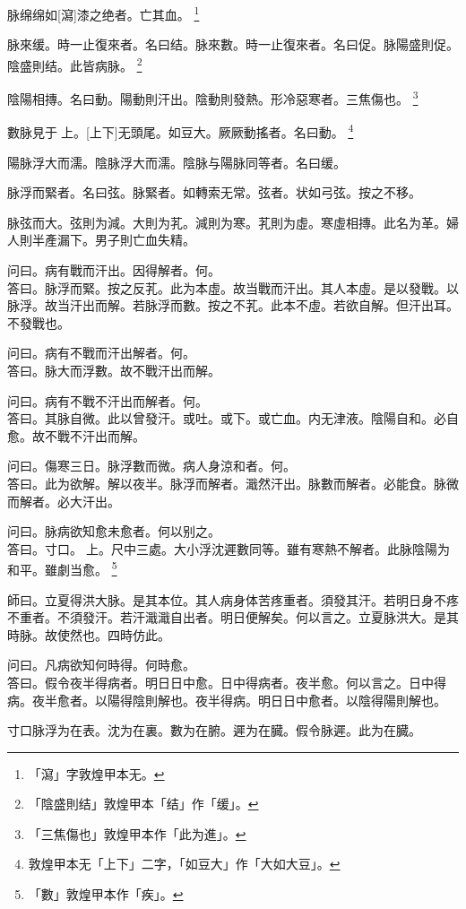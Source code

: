 \documentclass[oneside,b4paper]{ctexbook}
\begin{document}
\begin{flushleft}
脉绵绵如[瀉]漆之绝者。亡其血。
\footnote{「瀉」字敦煌甲本无。}

脉來缓。時一止復來者。名曰结。脉來數。時一止復來者。名曰促。脉陽盛則促。陰盛則结。此皆病脉。
\footnote{「陰盛則结」敦煌甲本「结」作「缓」。}

陰陽相摶。名曰動。陽動則汗出。陰動則發熱。形冷惡寒者。三焦傷也。
\footnote{「三焦傷也」敦煌甲本作「此为進」。}

數脉見于{𬮦}上。[上下]无頭尾。如豆大。厥厥動搖者。名曰動。
\footnote{敦煌甲本无「上下」二字，「如豆大」作「大如大豆」。}

陽脉浮大而濡。陰脉浮大而濡。陰脉与陽脉同等者。名曰缓。

脉浮而緊者。名曰弦。脉緊者。如轉索无常。弦者。状如弓弦。按之不移。

脉弦而大。弦則为減。大則为芤。減則为寒。芤則为虛。寒虛相摶。此名为革。婦人則半產漏下。男子則亡血失精。

问曰。病有戰而汗出。因得解者。何。\\
答曰。脉浮而緊。按之反芤。此为本虛。故当戰而汗出。其人本虛。是以發戰。以脉浮。故当汗出而解。若脉浮而數。按之不芤。此本不虛。若欲自解。但汗出耳。不發戰也。

问曰。病有不戰而汗出解者。何。\\
答曰。脉大而浮數。故不戰汗出而解。

问曰。病有不戰不汗出而解者。何。\\
答曰。其脉自微。此以曾發汗。或吐。或下。或亡血。内无津液。陰陽自和。必自愈。故不戰不汗出而解。

问曰。傷寒三日。脉浮數而微。病人身涼和者。何。\\
答曰。此为欲解。解以夜半。脉浮而解者。濈然汗出。脉數而解者。必能食。脉微而解者。必大汗出。

问曰。脉病欲知愈未愈者。何以别之。\\
答曰。寸口。{𬮦}上。尺中三處。大小浮沈遲數同等。雖有寒熱不解者。此脉陰陽为和平。雖劇当愈。
\footnote{「數」敦煌甲本作「疾」。}

師曰。立夏得洪大脉。是其本位。其人病身体苦疼重者。須發其汗。若明日身不疼不重者。不須發汗。若汗濈濈自出者。明日便解矣。何以言之。立夏脉洪大。是其時脉。故使然也。四時仿此。

问曰。凡病欲知何時得。何時愈。\\
答曰。假令夜半得病者。明日日中愈。日中得病者。夜半愈。何以言之。日中得病。夜半愈者。以陽得陰則解也。夜半得病。明日日中愈者。以陰得陽則解也。

寸口脉浮为在表。沈为在裏。數为在腑。遲为在臓。假令脉遲。此为在臓。


\end{flushleft}
\end{document}
